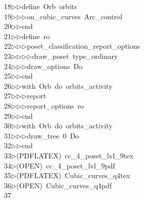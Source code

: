 \begin{tabbing}
18\>$\triangleright$\>$\triangleright$\>define\ Orb\ orbits\ \\[0pt]
19\>$\triangleright$\>$\triangleright$\>$\triangleright$\>on\_cubic\_curves\ Arc\_control\ \\[0pt]
20\>$\triangleright$\>$\triangleright$\>end\ \\[0pt]
21\>$\triangleright$\>$\triangleright$\>define\ ro\ \\[0pt]
22\>$\triangleright$\>$\triangleright$\>$\triangleright$\>poset\_classification\_report\_options\ \\[0pt]
23\>$\triangleright$\>$\triangleright$\>$\triangleright$\>$\triangleright$\>draw\_poset\ type\_ordinary\ \\[0pt]
24\>$\triangleright$\>$\triangleright$\>$\triangleright$\>draw\_options\ Do\ \\[0pt]
25\>$\triangleright$\>$\triangleright$\>end\ \\[0pt]
26\>$\triangleright$\>$\triangleright$\>with\ Orb\ do\ orbits\_activity\ \\[0pt]
27\>$\triangleright$\>$\triangleright$\>$\triangleright$\>report\ \ \\[0pt]
28\>$\triangleright$\>$\triangleright$\>$\triangleright$\>report\_options\ ro\ \\[0pt]
29\>$\triangleright$\>$\triangleright$\>end\\[0pt]
30\>$\triangleright$\>$\triangleright$\>with\ Orb\ do\ orbits\_activity\ \\[0pt]
31\>$\triangleright$\>$\triangleright$\>$\triangleright$\>draw\_tree\ 0\ Do\ \\[0pt]
32\>$\triangleright$\>$\triangleright$\>end\\[0pt]
33\>$\triangleright$\>(PDFLATEX)\ cc\_4\_poset\_lvl\_9tex\\[0pt]
34\>$\triangleright$\>(OPEN)\ cc\_4\_poset\_lvl\_9pdf\\[0pt]
35\>$\triangleright$\>(PDFLATEX)\ Cubic\_curves\_q4tex\\[0pt]
36\>$\triangleright$\>(OPEN)\ Cubic\_curves\_q4pdf\\[0pt]
37\>\end{tabbing}
